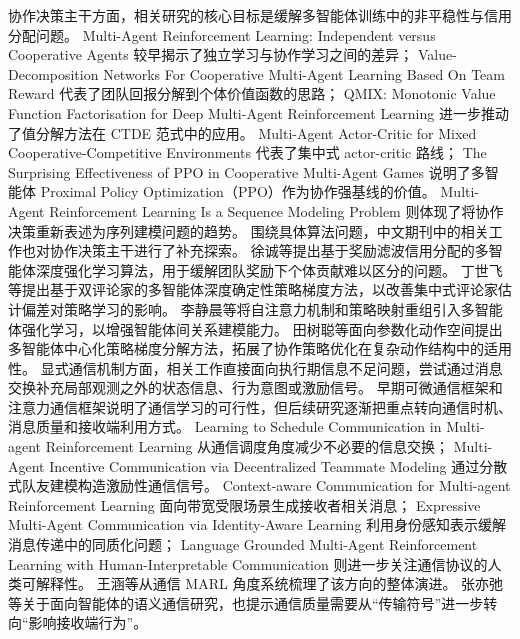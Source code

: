 协作决策主干方面，相关研究的核心目标是缓解多智能体训练中的非平稳性与信用分配问题。
Multi-Agent Reinforcement Learning: Independent versus Cooperative Agents
较早揭示了独立学习与协作学习之间的差异\cite{tan1993iql}；
Value-Decomposition Networks For Cooperative Multi-Agent Learning Based On Team Reward
代表了团队回报分解到个体价值函数的思路\cite{sunehag2018vdn}；
QMIX: Monotonic Value Function Factorisation for Deep Multi-Agent Reinforcement Learning
进一步推动了值分解方法在 CTDE 范式中的应用\cite{rashid2018qmix}。
Multi-Agent Actor-Critic for Mixed Cooperative-Competitive Environments
代表了集中式 actor-critic 路线\cite{lowe2017maddpg}；
The Surprising Effectiveness of PPO in Cooperative Multi-Agent Games
说明了多智能体 Proximal Policy Optimization（PPO）作为协作强基线的价值\cite{yu2021mappo}。
Multi-Agent Reinforcement Learning Is a Sequence Modeling Problem
则体现了将协作决策重新表述为序列建模问题的趋势\cite{wen2022mat}。
围绕具体算法问题，中文期刊中的相关工作也对协作决策主干进行了补充探索。
徐诚等提出基于奖励滤波信用分配的多智能体深度强化学习算法，用于缓解团队奖励下个体贡献难以区分的问题\cite{xu2022rewardfilter_cn}。
丁世飞等提出基于双评论家的多智能体深度确定性策略梯度方法，以改善集中式评论家估计偏差对策略学习的影响\cite{ding2023maddpgdc_cn}。
李静晨等将自注意力机制和策略映射重组引入多智能体强化学习，以增强智能体间关系建模能力\cite{li2022selfattention_cn}。
田树聪等面向参数化动作空间提出多智能体中心化策略梯度分解方法，拓展了协作策略优化在复杂动作结构中的适用性\cite{tian2025fmacparam_cn}。
显式通信机制方面，相关工作直接面向执行期信息不足问题，尝试通过消息交换补充局部观测之外的状态信息、行为意图或激励信号。
早期可微通信框架和注意力通信框架说明了通信学习的可行性，但后续研究逐渐把重点转向通信时机、消息质量和接收端利用方式。
Learning to Schedule Communication in Multi-agent Reinforcement Learning
从通信调度角度减少不必要的信息交换\cite{kim2019schednet}；
Multi-Agent Incentive Communication via Decentralized Teammate Modeling
通过分散式队友建模构造激励性通信信号\cite{yuan2022maic}。
Context-aware Communication for Multi-agent Reinforcement Learning
面向带宽受限场景生成接收者相关消息\cite{li2024cacom}；
Expressive Multi-Agent Communication via Identity-Aware Learning
利用身份感知表示缓解消息传递中的同质化问题\cite{du2024ideal}；
Language Grounded Multi-Agent Reinforcement Learning with Human-Interpretable Communication
则进一步关注通信协议的人类可解释性\cite{li2024languagegroundedmarl}。
王涵等从通信 MARL 角度系统梳理了该方向的整体演进\cite{wang2022commmarl_cn}。
张亦弛等关于面向智能体的语义通信研究，也提示通信质量需要从“传输符号”进一步转向“影响接收端行为”\cite{zhang2022semanticcomm_cn}。

